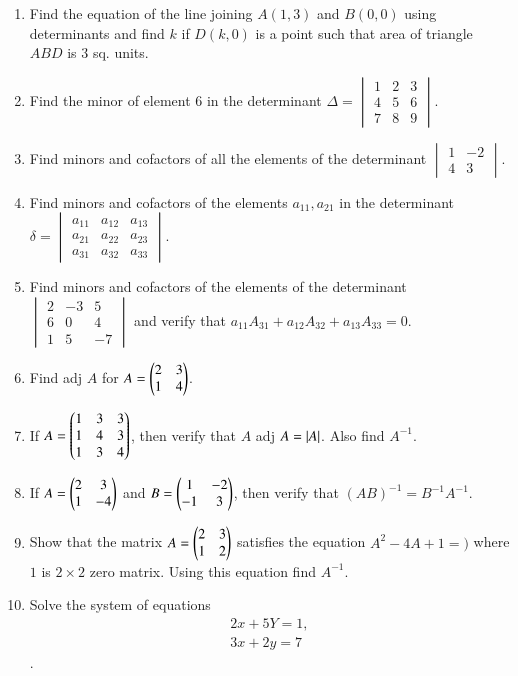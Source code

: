 \documentclass{article}
\theoremstyle{remark}
\begin{document}
\begin{enumerate}
\item Find the equation of the line joining $A(1,3)$ and $B(0,0)$ using determinants and find  $k$ if $D(k,0)$ is a point such that area of triangle $ABD$ is $3$ sq. units.
\item Find the minor of element $6$ in the determinant $\Delta= \begin{vmatrix}1&2&3 \\4&5&6 \\7&8&9 \end{vmatrix}$.
\item Find minors and cofactors of all the elements of the determinant $\begin{vmatrix} 1&-2 \\ 4&3 \end{vmatrix}$.
\item Find minors and cofactors of the elements $a_{11}, a_{21}$ in the determinant $\delta= \begin{vmatrix} a_{11}&a_{12}&a_{13} \\a_{21}&a_{22}&a_{23} \\a_{31}&a_{32}&a_{33} \end{vmatrix}$.
\item Find minors and cofactors of the elements of the determinant $\begin{vmatrix} 2&-3&5 \\6&0&4 \\1&5&-7 \end{vmatrix}$ and verify that $a_{11}A_{31} + a_{12}A_{32} + a_{13}A_{33} = 0$.
\item Find adj $A$ for $A=\begin{pmatrix}2&3 \\ 1&4\end{pmatrix}$.
\item If $A=\begin{pmatrix}1&3&3 \\1&4&3 \\ 1&3&4\end{pmatrix}$, then verify that $A$ adj $A = \left\vert A\right\vert$. Also find $A^{-1}$.
\item If $A=\begin{pmatrix}2&3 \\1&-4\end{pmatrix}$ and $B=\begin{pmatrix}1&-2 \\-1&3\end{pmatrix}$, then verify that $(AB)^{-1} = B^{-1}A^{-1}$.
\item Show that the matrix $A=\begin{pmatrix}2&3 \\1&2\end{pmatrix}$ satisfies the equation $A^2-4A+1=)$ where $1$ is $2\times 2$ zero matrix. Using this equation find $A^{-1}$.
\item Solve the system of equations
 \begin{align}2x+5Y=1,\\ 3x+2y=7\end{align}.

\end{enumerate}
\end{document}
